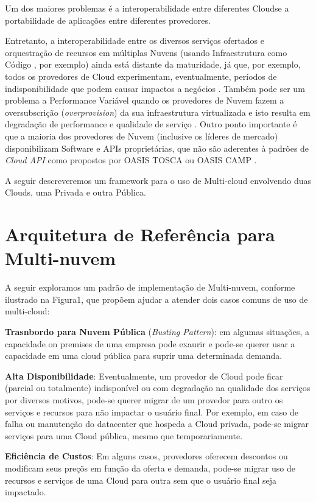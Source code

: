 \documentclass[12pt]{article}
\begin{document}
	Um dos maiores problemas é a interoperabilidade entre diferentes Cloudse a portabilidade de aplicações entre diferentes provedores.
	
	Entretanto, a interoperabilidade entre os diversos serviços ofertados e orquestração de recursos em múltiplas Nuvens (usando Infraestrutura como Código \cite{Morris:2016}, por exemplo) ainda está distante da maturidade, já que, por exemplo, todos os provedores de Cloud experimentam, eventualmente, períodos de indisponibilidade que podem causar impactos a negócios \cite{Fisher:2018}. Também pode ser um problema a Performance Variável quando os provedores de Nuvem fazem a oversubscrição (\textit{overprovision}) da sua infraestrutura virtualizada e isto resulta em degradação de performance e qualidade de serviço \cite{CloudSpectator:2017}. Outro ponto importante é que a maioria dos provedores de Nuvem  (inclusive os líderes de mercado) disponibilizam Software e APIs proprietárias, que não são aderentes à padrões de \textit{Cloud API} como propostos por OASIS TOSCA \cite{TOSCA:2019} ou OASIS CAMP \cite{CAMP:2019}.
	 
	A seguir descreveremos um framework para o uso de Multi-cloud envolvendo duas Clouds, uma Privada e outra Pública. 
	
	\section{Arquitetura de Referência para Multi-nuvem}
	
	A seguir exploramos um padrão de implementação de Multi-nuvem, conforme ilustrado na Figura1, que propõem ajudar a atender dois casos comuns de uso de multi-cloud:
	
	\textbf{Trasnbordo para Nuvem Pública} (\textit{Busting Pattern}): em algumas situações, a capacidade on premises de uma empresa pode exaurir e pode-se querer usar a capacidade em uma cloud pública para suprir uma determinada demanda.
	
	\textbf{Alta Disponibilidade}: Eventualmente, um provedor de Cloud pode ficar (parcial ou totalmente) indisponível ou com degradação na qualidade dos serviços por diversos motivos, pode-se querer migrar de um provedor para outro os serviços e recursos para não impactar o usuário final. Por exemplo, em caso de falha ou manutenção do datacenter que hospeda a Cloud privada, pode-se migrar serviços para uma Cloud pública, mesmo que temporariamente.
	   
	\textbf{Eficiência de Custos}: Em alguns casos, provedores oferecem descontos ou modificam seus preçõs em função da oferta e demanda, pode-se migrar uso de recursos e serviços de uma Cloud para outra sem que o usuário final seja impactado.
	
\end{document}
